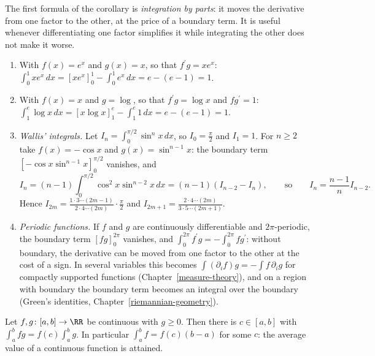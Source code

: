 The first formula of the corollary is \emph{integration by parts}: it moves the derivative from one factor to the other, at the price of a boundary term. It is useful whenever differentiating
one factor simplifies it while integrating the other does not make it worse.

\begin{example}\label{real-analysis:example-integration-by-parts}
\begin{enumerate}
\item With $f(x) = e^x$ and $g(x) = x$, so that $f^{\prime}g = xe^x$: $\int_0^1xe^x\,dx = [xe^x]_0^1 - \int_0^1e^x\,dx = e - (e - 1) = 1$.
\item With $f(x) = x$ and $g = \log$, so that $f^{\prime}g = \log x$ and $fg^{\prime} = 1$: $\int_1^e\log x\,dx = [x\log x]_1^e - \int_1^e1\,dx = e - (e - 1) = 1$.
\item \emph{Wallis' integrals.} Let $I_n = \int_0^{\pi/2}\sin^nx\,dx$, so $I_0 = \frac\pi2$ and $I_1 = 1$. For $n \geq 2$ take $f(x) = -\cos x$ and $g(x) = \sin^{n-1}x$: the boundary term
$[-\cos x\sin^{n-1}x]_0^{\pi/2}$ vanishes, and
\[
I_n = (n - 1)\int_0^{\pi/2}\cos^2x\sin^{n-2}x\,dx = (n - 1)(I_{n-2} - I_n), \qquad\text{so}\qquad I_n = \frac{n - 1}{n}I_{n-2} .
\]
Hence $I_{2m} = \frac{1 \cdot 3 \cdots (2m-1)}{2 \cdot 4 \cdots (2m)}\cdot\frac\pi2$ and $I_{2m+1} = \frac{2 \cdot 4 \cdots (2m)}{3 \cdot 5 \cdots (2m+1)}$.
\item \emph{Periodic functions.} If $f$ and $g$ are continuously differentiable and $2\pi$-periodic, the boundary term $[fg]_0^{2\pi}$ vanishes, and $\int_0^{2\pi}f^{\prime}g = -\int_0^{2\pi}fg^{\prime}$:
without boundary, the derivative can be moved from one factor to the other at the cost of a sign. In several variables this becomes $\int(\partial_if)g = -\int f\,\partial_ig$ for compactly supported
functions (Chapter~\ref{measure-theory}), and on a region with boundary the boundary term becomes an integral over the boundary (Green's identities, Chapter~\ref{riemannian-geometry}).
\end{enumerate}
\end{example}

\begin{proposition}\label{real-analysis:proposition-mean-value-integrals}
Let $f, g \colon [a, b] \to \RR$ be continuous with $g \geq 0$. Then there is $c \in [a, b]$ with $\int_a^bfg = f(c)\int_a^bg$. In particular $\int_a^bf = f(c)(b - a)$ for some $c$: the average
value of a continuous function is attained.
\end{proposition}

